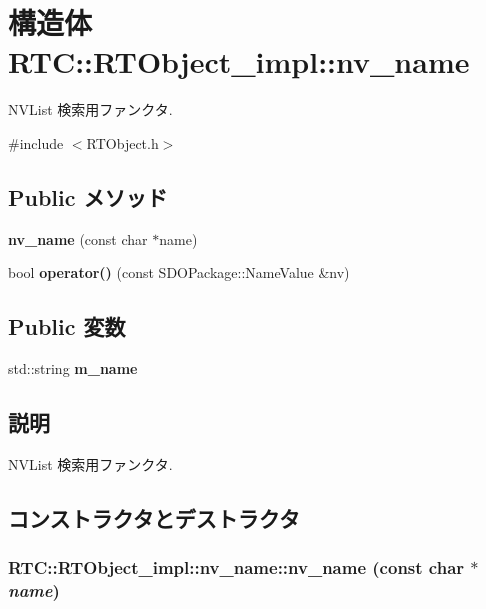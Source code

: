 \section{構造体 RTC::RTObject\_\-impl::nv\_\-name}
\label{structRTC_1_1RTObject__impl_1_1nv__name}


NVList 検索用ファンクタ.  




{\ttfamily \#include $<$RTObject.h$>$}

\subsection*{Public メソッド}
\begin{DoxyCompactItemize}
\item 
{\bf nv\_\-name} (const char $\ast$name)
\item 
bool {\bf operator()} (const SDOPackage::NameValue \&nv)
\end{DoxyCompactItemize}
\subsection*{Public 変数}
\begin{DoxyCompactItemize}
\item 
std::string {\bf m\_\-name}
\end{DoxyCompactItemize}


\subsection{説明}
NVList 検索用ファンクタ. 

\subsection{コンストラクタとデストラクタ}
\subsubsection[{nv\_\-name}]{\setlength{\rightskip}{0pt plus 5cm}RTC::RTObject\_\-impl::nv\_\-name::nv\_\-name (const char $\ast$ {\em name})\hspace{0.3cm}{\ttfamily  [inline]}}\label{structRTC_1_1RTObject__impl_1_1nv__name_ac77f24a1c8c6b7e2b106bb45e881cd3c}


